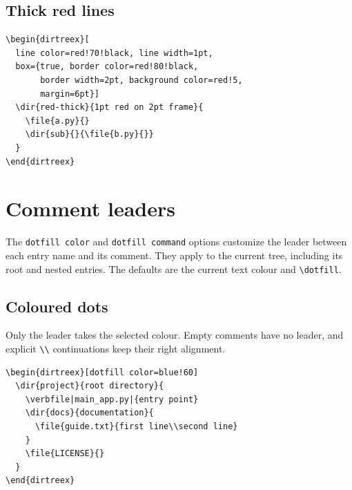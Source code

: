 \documentclass[11pt]{article}
\begin{document}
\subsection{Thick red lines}

\begin{Verbatim}
\begin{dirtreex}[
  line color=red!70!black, line width=1pt,
  box={true, border color=red!80!black,
       border width=2pt, background color=red!5,
       margin=6pt}]
  \dir{red-thick}{1pt red on 2pt frame}{
    \file{a.py}{}
    \dir{sub}{}{\file{b.py}{}}
  }
\end{dirtreex}
\end{Verbatim}

\begin{dirtreex}[
  line color=red!70!black, line width=1pt,
  box={true, border color=red!80!black,
       border width=2pt, background color=red!5,
       margin=6pt}]
\end{dirtreex}

\clearpage

\section{Comment leaders}

The \verb|dotfill color| and \verb|dotfill command| options customize the
leader between each entry name and its comment. They apply to the current
tree, including its root and nested entries. The defaults are the current
text colour and \verb|\dotfill|.

\subsection{Coloured dots}

Only the leader takes the selected colour. Empty comments have no leader,
and explicit \verb|\\| continuations keep their right alignment.

\begin{Verbatim}
\begin{dirtreex}[dotfill color=blue!60]
  \dir{project}{root directory}{
    \verbfile|main_app.py|{entry point}
    \dir{docs}{documentation}{
      \file{guide.txt}{first line\\second line}
    }
    \file{LICENSE}{}
  }
\end{dirtreex}
\end{Verbatim}
\end{document}
